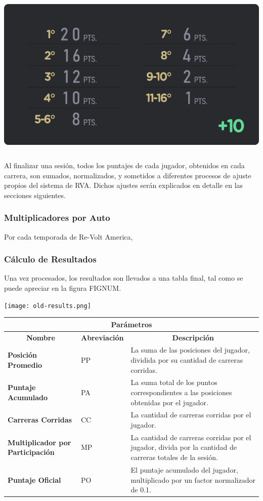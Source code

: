 \includegraphics[width=15cm, height=8cm]{img/points-big.png}

Al finalizar una sesión, todos los puntajes de cada jugador, obtenidos en cada carrera, son sumados, normalizados, y sometidos a diferentes procesos de ajuste propios del sistema de RVA. Dichos ajustes serán explicados en detalle en las secciones siguientes.

\subsubsection{Multiplicadores por Auto}
Por cada temporada de Re-Volt America, 

\subsubsection{Cálculo de Resultados}
Una vez procesados, los resultados son llevados a una tabla final, tal como se puede apreciar en la figura FIGNUM.

\texttt{[image: old-results.png]}

\begin{center}
	\begin{tabular}{ | p{5cm} | l | p{8cm} |}
		\hline
		\multicolumn{3}{|c|}{\textbf{Parámetros}} \\
		\hline
		\multicolumn{1}{|c|}{\textbf{Nombre}} & \multicolumn{1}{|c|}{\textbf{Abreviación}} & \multicolumn{1}{|c|}{\textbf{Descripción}} \\
		\hline
		{\textbf{Posición Promedio}} & PP & La suma de las posiciones del jugador, dividida por su cantidad de carreras corridas. \\ \hline
		{\textbf{Puntaje Acumulado}} & PA & La suma total de los puntos correspondientes a las posiciones obtenidas por el jugador. \\ \hline
		{\textbf{Carreras Corridas}} & CC & La cantidad de carreras corridas por el jugador. \\ \hline
		{\textbf{Multiplicador por Participación}} & MP & La cantidad de carreras corridas por el jugador, divida por la cantidad de carreras totales de la sesión. \\ \hline
		{\textbf{Puntaje Oficial}} & PO & El puntaje acumulado del jugador, multiplicado por un factor normalizador de 0.1. \\ \hline
	\end{tabular}
\end{center}

